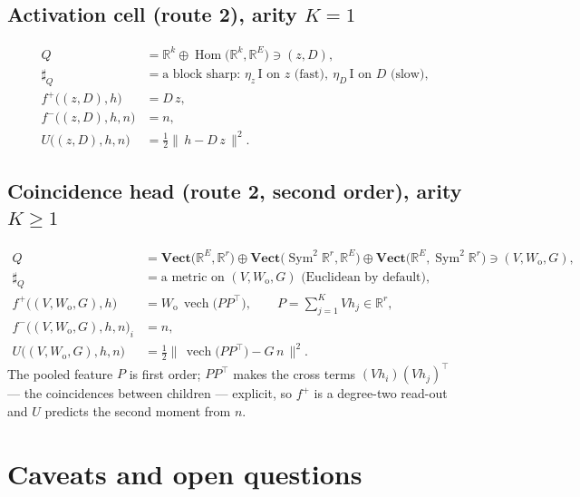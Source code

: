 \documentclass[11pt]{article}
\theoremstyle{plain}
\theoremstyle{definition}
\theoremstyle{remark}
\newcommand{\rr}{\mathbb{R}}
\newcommand{\Cat}[1]{\mathbf{#1}}
\newcommand{\vect}{\Cat{Vect}}
\newcommand{\sharpR}{\sharp}
\newcommand{\inpt}[1]{#1^{-}}
\newcommand{\outp}[1]{#1^{+}}
\DeclareMathOperator{\Hom}{Hom}
\newcommand{\Wo}{W_{\mathrm o}}
\begin{document}
\subsection*{Activation cell (route 2), arity $K=1$}
\[
\begin{aligned}
  Q                    &= \rr^{k}\oplus\Hom\bigl(\rr^{k},\rr^E\bigr)\ni(z,D),\\
  \sharpR_Q            &= \text{a block sharp: }\eta_z\,\mathrm I\text{ on }z\text{ (fast)},\ \eta_D\,\mathrm I\text{ on }D\text{ (slow)},\\
  \outp f\bigl((z,D),h\bigr)     &= D\,z,\\
  \inpt f\bigl((z,D),h,n\bigr)   &= n,\\
  U\bigl((z,D),h,n\bigr)         &= \tfrac12\bigl\lVert\,h-D\,z\,\bigr\rVert^{2}.
\end{aligned}
\]

\subsection*{Coincidence head (route 2, second order), arity $K\ge1$}
\[
\begin{aligned}
  Q                    &= \vect\bigl(\rr^E,\rr^{r}\bigr)\oplus\vect\bigl(\operatorname{Sym}^2\rr^{r},\rr^E\bigr)
                          \oplus\vect\bigl(\rr^E,\operatorname{Sym}^2\rr^{r}\bigr)\ni(V,\Wo,G),\\
  \sharpR_Q            &= \text{a metric on }(V,\Wo,G)\text{ (Euclidean by default)},\\
  \outp f\bigl((V,\Wo,G),h\bigr)   &= \Wo\,\operatorname{vech}\bigl(P P^{\top}\bigr),\qquad P=\sum_{j=1}^{K}V h_j\in\rr^{r},\\
  \inpt f\bigl((V,\Wo,G),h,n\bigr)_i &= n,\\
  U\bigl((V,\Wo,G),h,n\bigr)       &= \tfrac12\bigl\lVert\,\operatorname{vech}\bigl(P P^{\top}\bigr)-G\,n\,\bigr\rVert^{2}.
\end{aligned}
\]
The pooled feature $P$ is first order; $P P^{\top}$ makes the cross terms
$(V h_i)(V h_j)^{\top}$ --- the coincidences between children --- explicit, so
$\outp f$ is a degree-two read-out and $U$ predicts the second moment from $n$.

\section{Caveats and open questions}\label{sec.open}
\end{document}
